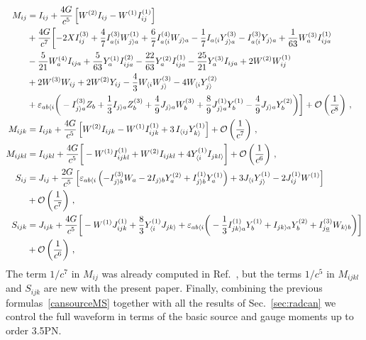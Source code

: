 \documentclass[prd,preprint,superscriptaddress,tightenlines,nofootinbib,
  eqsecnum,showpacs]{revtex4}
\begin{document}
\begin{subequations}\label{cansourceMS}
\begin{align}  
M_{ij} &= I_{ij} +\frac{4G}{c^5}
\left[W^{(2)}I_{ij}-W^{(1)}I_{ij}^{(1)}\right] \nonumber\\ &+
\frac{4G}{c^7} \biggl[ - 2 X I_{ij}^{(3)} + \frac{4}{7} I_{a \langle
    i}^{(3)} W_{j \rangle a}^{(1)} + \frac{6}{7} I_{a \langle i}^{(4)}
  W_{j \rangle a} - \frac{1}{7} I_{a \langle i} Y_{j \rangle a}^{(3)}
  - I_{a \langle i}^{(3)} Y_{j \rangle a} + \frac{1}{63} W_a^{(3)}
  I_{ija}^{(1)} \nonumber \\ & - \frac{5}{21} W_a^{(4)} I_{ija} +
  \frac{5}{63} Y_a^{(1)} I_{ija}^{(2)} - \frac{22}{63} Y_a^{(2)}
  I_{ija}^{(1)} - \frac{25}{21} Y_a^{(3)} I_{ija} + 2 W^{(2)}
  W_{ij}^{(1)} \nonumber \\ & + 2 W^{(3)} W_{ij} + 2 W^{(2)} Y_{ij} -
  \frac{4}{3} W_{\langle i} W_{j \rangle}^{(3)} - 4 W_{\langle i} Y_{j
    \rangle}^{(2)} \nonumber \\ & + \varepsilon_{ab \langle i} \bigg(-
  I_{j \rangle a}^{(3)} Z_b + \frac{1}{3} I_{j \rangle a} Z_b^{(3)} +
  \frac{4}{9} J_{j \rangle a} W_b^{(3)} + \frac{8}{9} J_{j \rangle
    a}^{(1)} Y_b^{(1)} - \frac{4}{9} J_{j \rangle a} Y_b^{(2)} \bigg)
  \biggr] + \mathcal{O}\left(\frac{1}{c^8}\right)\,,\\
M_{ijk} &= I_{ijk} + {4G\over
  c^5}\left[W^{(2)}I_{ijk}-W^{(1)}I_{ijk}^{(1)}+3\,I_{\langle
    ij}Y_{k\rangle }^{(1)}\right] +
\mathcal{O}\left(\frac{1}{c^7}\right)\label{M3} \,,\\ 
M_{ijkl} &= I_{ijkl} + \frac{4 G}{c^5} \bigg[- W^{(1)} I_{ijkl}^{(1)} +
  W^{(2)} I_{ijkl} + 4 Y_{\langle i}^{(1)} I_{jkl \rangle} \bigg] +
\mathcal{O}\left(\frac{1}{c^6}\right)\,,\\
S_{ij} &= J_{ij} +{2G\over c^5}\left[\varepsilon_{ab\langle
    i}\left(-I_{j\rangle b}^{(3)}W_{a}-2I_{j\rangle b}Y_{a}^{(2)}
  +I_{j\rangle b}^{(1)}Y_{a}^{(1)}\right)+3J_{\langle i}Y_{j\rangle
  }^{(1)}-2J_{ij}^{(1)}W^{(1)}\right] \nonumber\\& +
\mathcal{O}\left(\frac{1}{c^7}\right)\,,\\
S_{ijk} &= J_{ijk} + \frac{4G}{c^5} \bigg[ - W^{(1)} J_{ijk}^{(1)} +
  \frac{8}{3} Y_{\langle i}^{(1)} J_{jk \rangle} + \varepsilon_{ab
    \langle i} \bigg(- \frac{1}{3} I_{jk \rangle a}^{(1)} Y_b^{(1)} +
  I_{jk \rangle a} Y_b^{(2)} + I_{j\underline{a}}^{(3)} W_{k \rangle
    b} \bigg) \bigg] \nonumber\\& +
\mathcal{O}\left(\frac{1}{c^6}\right)\,,
\end{align}
\end{subequations}
%
The term $1/c^7$ in $M_{ij}$ was already computed in
Ref.~\cite{FMBI12}, but the terms $1/c^5$ in $M_{ijkl}$ and $S_{ijk}$
are new with the present paper.  Finally, combining the previous
formulas~\eqref{cansourceMS} together with all the results of
Sec.~\ref{sec:radcan} we control the full waveform in terms of the
basic source and gauge moments up to order 3.5PN.
\end{document}
